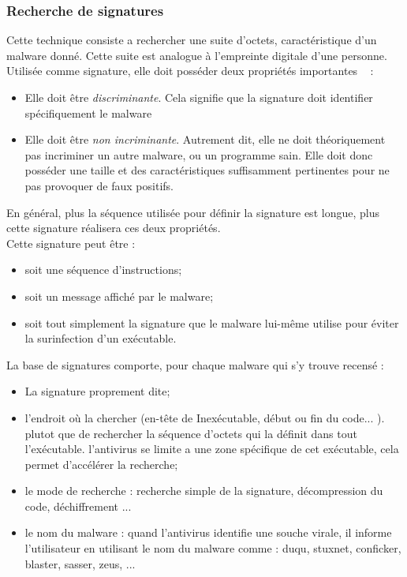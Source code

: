 \subsubsection{Recherche de signatures}
Cette technique consiste a rechercher une suite d'octets, caractéristique d'un malware donné. Cette suite est analogue à l'empreinte digitale d'une personne. Utilisée comme signature, elle doit posséder deux propriétés importantes ~\cite{anti} :
\begin{itemize}
\item Elle doit être \textit{discriminante}. Cela signifie que la signature doit identifier spécifiquement le malware
\item Elle doit être \textit{non incriminante}. Autrement dit, elle ne doit théoriquement
pas incriminer un autre malware, ou un programme sain. Elle doit donc posséder une taille et des caractéristiques suffisamment pertinentes pour ne pas provoquer de faux positifs.
\end{itemize}

En général, plus la séquence utilisée pour définir la signature est longue, plus cette signature réalisera ces deux propriétés.\\


Cette signature peut être :
\begin{itemize}
\item soit une séquence d'instructions;
\item soit un message affiché par le malware;
\item soit tout simplement la signature que le malware lui-même utilise pour éviter la surinfection d'un exécutable.
\end{itemize}


La base de signatures comporte, pour chaque malware qui s'y trouve recensé :
\begin{itemize}
\item La signature proprement dite;
\item l'endroit où la chercher (en-tête de Inexécutable, début ou fin du code... ).
plutot que de rechercher la séquence d'octets qui la définit dans tout l'exécutable. l'antivirus se limite a une zone spécifique de cet exécutable, cela permet d'accélérer la recherche;
\item le mode de recherche : recherche simple de la signature, décompression du code, déchiffrement ...\\
\item le nom du malware : quand l'antivirus identifie une souche virale, il informe l'utilisateur en utilisant le nom du malware comme : duqu, stuxnet, conficker, blaster, sasser, zeus, ...
\end{itemize}


